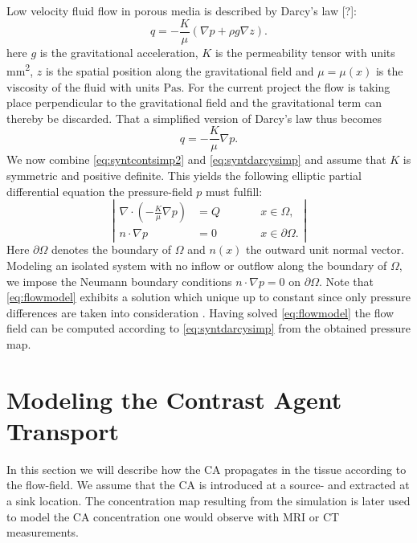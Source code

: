 \documentclass[paper=a4, fontsize=12pt,parskip=half,draft,headings=small]{scrartcl}
\begin{document}
	Low velocity fluid flow in porous media is described by Darcy's law [?]:
	\[
		q = -\frac{K}{\mu} \left( \nabla p + \rho g  \nabla z \right).
	\]
	here $g$ is the gravitational acceleration, $K$ is the permeability tensor with units \si{\square\milli\meter}, $z$ is the spatial position along the gravitational field and $\mu = \mu(x)$ is the viscosity of the fluid with units $\si{\pascal\second}$.
	For the current project the flow is taking place perpendicular to the gravitational field and the gravitational term can thereby be discarded.
	That a simplified version of Darcy's law thus becomes
	\begin{equation}
		q = -\frac{K}{\mu} \nabla p.
		\label{eq:syntdarcysimp}
	\end{equation}
	We now combine \eqref{eq:syntcontsimp2} and \eqref{eq:syntdarcysimp} and assume that $K$ is symmetric and positive definite.
	This yields the following elliptic partial differential equation the pressure-field $p$ must fulfill:
	\begin{equation}
		\left\vert
		\begin{alignedat}{2}
			\nabla \cdot \left( -\frac{K}{\mu} \nabla p \right) &= Q  \qquad &&x \in \Omega, \\
			n \cdot \nabla p &=0 &&x \in \partial \Omega.
		\end{alignedat}
		\right\vert
		\label{eq:flowmodel}
	\end{equation}
	Here $\partial \Omega$ denotes the boundary of $\Omega$ and $n(x)$ the outward unit normal vector. 
	Modeling an isolated system with no inflow or outflow along the boundary of $\Omega$, we impose the Neumann boundary conditions $n \cdot \nabla p = 0$ on $\partial \Omega$.
	Note that \eqref{eq:flowmodel} exhibits a solution which unique up to constant since only pressure differences are taken into consideration \cite{evans1998}.
	Having solved \eqref{eq:flowmodel} the flow field can be computed according to \eqref{eq:syntdarcysimp} from the obtained pressure map. 
	
	
	\section{Modeling the Contrast Agent Transport}\label{sec:transport}
	In this section we will describe how the CA propagates in the tissue according to the flow-field.
	We assume that the CA is introduced at a source- and extracted at a sink location.
	The concentration map resulting from the simulation is later used to model the CA concentration one would observe with MRI or CT measurements.
	
\end{document}
